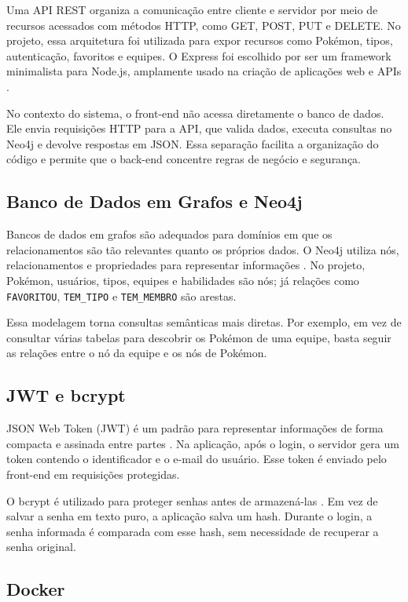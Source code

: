 \documentclass[12pt]{article}
\begin{document}
Uma API REST organiza a comunicação entre cliente e servidor por meio de recursos acessados com métodos HTTP, como GET, POST, PUT e DELETE. No projeto, essa arquitetura foi utilizada para expor recursos como Pokémon, tipos, autenticação, favoritos e equipes. O Express foi escolhido por ser um framework minimalista para Node.js, amplamente usado na criação de aplicações web e APIs \cite{expressDocs}.

No contexto do sistema, o front-end não acessa diretamente o banco de dados. Ele envia requisições HTTP para a API, que valida dados, executa consultas no Neo4j e devolve respostas em JSON. Essa separação facilita a organização do código e permite que o back-end concentre regras de negócio e segurança.

\subsection{Banco de Dados em Grafos e Neo4j}

Bancos de dados em grafos são adequados para domínios em que os relacionamentos são tão relevantes quanto os próprios dados. O Neo4j utiliza nós, relacionamentos e propriedades para representar informações \cite{neo4jDocs}. No projeto, Pokémon, usuários, tipos, equipes e habilidades são nós; já relações como \texttt{FAVORITOU}, \texttt{TEM\_TIPO} e \texttt{TEM\_MEMBRO} são arestas.

Essa modelagem torna consultas semânticas mais diretas. Por exemplo, em vez de consultar várias tabelas para descobrir os Pokémon de uma equipe, basta seguir as relações entre o nó da equipe e os nós de Pokémon.

\subsection{JWT e bcrypt}

JSON Web Token (JWT) é um padrão para representar informações de forma compacta e assinada entre partes \cite{jwtIntro}. Na aplicação, após o login, o servidor gera um token contendo o identificador e o e-mail do usuário. Esse token é enviado pelo front-end em requisições protegidas.

O bcrypt é utilizado para proteger senhas antes de armazená-las \cite{bcryptPackage}. Em vez de salvar a senha em texto puro, a aplicação salva um hash. Durante o login, a senha informada é comparada com esse hash, sem necessidade de recuperar a senha original.

\subsection{Docker}
\end{document}
